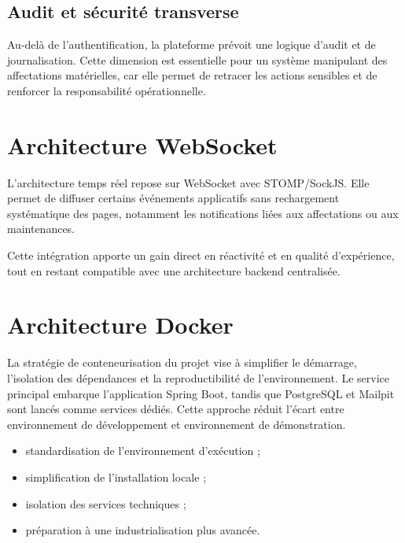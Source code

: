 \subsection{Audit et sécurité transverse}
Au-delà de l'authentification, la plateforme prévoit une logique d'audit et de journalisation. Cette dimension est essentielle pour un système manipulant des affectations matérielles, car elle permet de retracer les actions sensibles et de renforcer la responsabilité opérationnelle.

\section{Architecture WebSocket}
L'architecture temps réel repose sur WebSocket avec STOMP/SockJS. Elle permet de diffuser certains événements applicatifs sans rechargement systématique des pages, notamment les notifications liées aux affectations ou aux maintenances.

\begin{codeblock}[H]
\caption{Configuration WebSocket}

\end{codeblock}

Cette intégration apporte un gain direct en réactivité et en qualité d'expérience, tout en restant compatible avec une architecture backend centralisée.

\section{Architecture Docker}
La stratégie de conteneurisation du projet vise à simplifier le démarrage, l'isolation des dépendances et la reproductibilité de l'environnement. Le service principal embarque l'application Spring Boot, tandis que PostgreSQL et Mailpit sont lancés comme services dédiés. Cette approche réduit l'écart entre environnement de développement et environnement de démonstration.

\begin{methodbox}
\begin{itemize}
  \item standardisation de l'environnement d'exécution ;
  \item simplification de l'installation locale ;
  \item isolation des services techniques ;
  \item préparation à une industrialisation plus avancée.
\end{itemize}
\end{methodbox}

